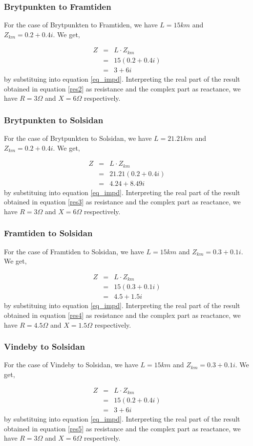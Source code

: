 \documentclass{report}
\newcommand{\case}[1]{\subsubsection*{#1}}
\newcommand{\cmp}[2]{\ensuremath{#1+#2i}}
\begin{document}
\case {Brytpunkten to Framtiden}
For the case of Brytpunkten to Framtiden, we have $L=15km$ and $Z_{km}=\cmp{0.2}{0.4}$.  We get,

\begin{eqnarray}
Z&=&  L \cdot Z_{km} \\
&=&15 (\cmp{0.2}{0.4}) \\
&=& \cmp{3}{6} \label{res2}
\end{eqnarray} by substituing into equation \ref{eq_impd}. Interpreting the real part of the result obtained in equation \ref{res2} as resistance and the complex part as reactance, we have $R=3\Omega$ and $X=6\Omega$ respectively.

\case {Brytpunkten to Solsidan}
For the case of Brytpunkten to Solsidan, we have $L=21.21km$ and $Z_{km}=\cmp{0.2}{0.4}$.  We get,

\begin{eqnarray}
Z&=&  L \cdot Z_{km} \\
&=&21.21 (\cmp{0.2}{0.4}) \\
&=& \cmp{4.24}{8.49} \label{res3}
\end{eqnarray} by substituing into equation \ref{eq_impd}. Interpreting the real part of the result obtained in equation \ref{res3} as resistance and the complex part as reactance, we have $R=3\Omega$ and $X=6\Omega$ respectively.

\case {Framtiden to Solsidan}
For the case of Framtiden to Solsidan, we have $L=15km$ and $Z_{km}=\cmp{0.3}{0.1}$.  We get,

\begin{eqnarray}
Z&=&  L \cdot Z_{km} \\
&=&15 (\cmp{0.3}{0.1}) \\
&=& \cmp{4.5}{1.5} \label{res4}
\end{eqnarray} by substituing into equation \ref{eq_impd}. Interpreting the real part of the result obtained in equation \ref{res4} as resistance and the complex part as reactance, we have $R=4.5\Omega$ and $X=1.5\Omega$ respectively.

\case {Vindeby to Solsidan}
For the case of Vindeby to Solsidan, we have $L=15km$ and $Z_{km}=\cmp{0.3}{0.1}$.  We get,

\begin{eqnarray}
Z&=&  L \cdot Z_{km} \\
&=&15 (\cmp{0.2}{0.4}) \\
&=& \cmp{3}{6} \label{res5}
\end{eqnarray} by substituing into equation \ref{eq_impd}. Interpreting the real part of the result obtained in equation \ref{res5} as resistance and the complex part as reactance, we have $R=3\Omega$ and $X=6\Omega$ respectively.
\end{document}
